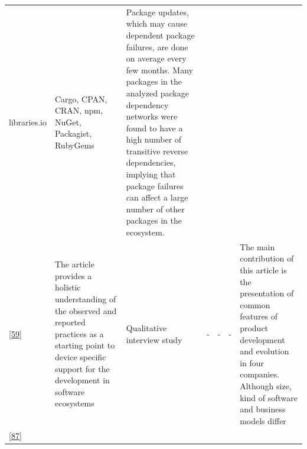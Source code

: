 \documentclass[]{book}
\begin{document}
\begin{longtable}[]{@{}lllllll@{}}
\begin{minipage}[t]{0.10\columnwidth}
libraries.io\strut
\end{minipage} & \begin{minipage}[t]{0.12\columnwidth}\raggedright\strut
Cargo, CPAN, CRAN, npm, NuGet, Packagist, RubyGems\strut
\end{minipage} & \begin{minipage}[t]{0.10\columnwidth}\raggedright\strut
Package updates, which may cause dependent package failures, are done on
average every few months. Many packages in the analyzed package
dependency networks were found to have a high number of transitive
reverse dependencies, implying that package failures can affect a large
number of other packages in the ecosystem.\strut
\end{minipage}\tabularnewline
\begin{minipage}[t]{0.09\columnwidth}\raggedright\strut
{[}\protect\hyperlink{ref-Dittrich2014}{59}{]}\strut
\end{minipage} & \begin{minipage}[t]{0.16\columnwidth}\raggedright\strut
The article provides a holistic understanding of the observed and
reported practices as a starting point to device specific support for
the development in software ecosystems\strut
\end{minipage} & \begin{minipage}[t]{0.17\columnwidth}\raggedright\strut
Qualitative interview study\strut
\end{minipage} & \begin{minipage}[t]{0.07\columnwidth}\raggedright\strut
-\strut
\end{minipage} & \begin{minipage}[t]{0.10\columnwidth}\raggedright\strut
-\strut
\end{minipage} & \begin{minipage}[t]{0.12\columnwidth}\raggedright\strut
-\strut
\end{minipage} & \begin{minipage}[t]{0.10\columnwidth}\raggedright\strut
The main contribution of this article is the presentation of common
features of product development and evolution in four companies.
Although size, kind of software and business models differ\strut
\end{minipage}\tabularnewline
\begin{minipage}[t]{0.09\columnwidth}\raggedright\strut
{[}\protect\hyperlink{ref-Izquierdo2018}{87}{]}\strut
\end{minipage} & \begin{minipage}[t]{0.16\columnwidth}\raggedright\strut

\end{minipage}
\end{longtable}
\end{document}

